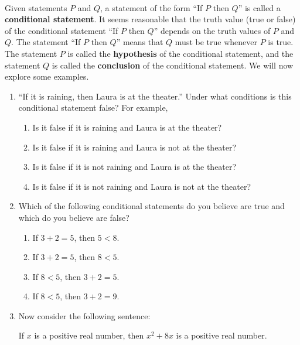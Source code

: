 %
\begin{previewactivity}\label{PA:conditional} \hfill \\
Given statements $P$ and $Q$, a statement of the form ``If $P$ then $Q$'' is called a 
\textbf{conditional statement}.
%
%
 It seems reasonable that the truth value (true or false) of the conditional statement 
``If $P$ then $Q$'' depends on the truth values of $P$  and  $Q$.  The statement ``If $P$ then $Q$'' means that $Q$  must be true whenever $P$ is true.  The statement $P$ is called the \textbf{hypothesis}
%
 of the conditional statement, and the statement $Q$ is called the \textbf{conclusion}
%
 of the conditional statement.  We will now explore some examples.

\begin{enumerate}
\item ``If it is raining, then Laura is at the theater.''
Under what conditions is this conditional statement false?  For example,
\begin{enumerate}
\item Is it false if it is raining and Laura is at the theater?
\item Is it false if it is raining and Laura is not at the theater?
\item Is it false if it is not raining and Laura is at the theater?
\item Is it false if it is not raining and Laura is not at the theater?
\end{enumerate}

\item Which of the following conditional statements do you believe are true and which do you believe are false?
\begin{multicols}{2}
\begin{enumerate}
\item If $3 + 2 = 5$, then $5 < 8$.
\item If $3 + 2 = 5$, then $8 < 5$.
\item If $8 < 5$, then $3 + 2 = 5$.
\item If $8 < 5$, then $3 + 2 = 9$.
\end{enumerate}
\end{multicols}

\item Now consider the following sentence:
\begin{center}
If $x$ is a positive real number, then $x^2 + 8x$ is a positive real number.
\end{center}


\end{enumerate}
\end{previewactivity}
